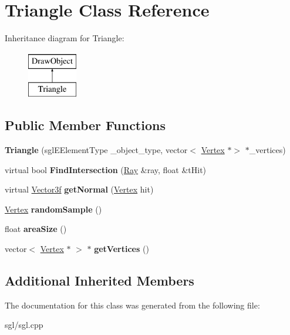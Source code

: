 \hypertarget{class_triangle}{}\section{Triangle Class Reference}
\label{class_triangle}
Inheritance diagram for Triangle\+:\begin{figure}[H]
\begin{center}
\leavevmode
\includegraphics[height=2.000000cm]{class_triangle}
\end{center}
\end{figure}
\subsection*{Public Member Functions}
\begin{DoxyCompactItemize}
\item 
\mbox{\label{class_triangle_aea5e936b8cb88b19c5cf6e9704bc13db}} 
{\bfseries Triangle} (sgl\+E\+Element\+Type \+\_\+object\+\_\+type, vector$<$ \hyperlink{class_vertex}{Vertex} $\ast$$>$ $\ast$\+\_\+vertices)
\item 
\mbox{\label{class_triangle_a5928933b2095b43375a38f48ec265c32}} 
virtual bool {\bfseries Find\+Intersection} (\hyperlink{class_ray}{Ray} \&ray, float \&t\+Hit)
\item 
\mbox{\label{class_triangle_aa2ba0470a4524e65335e1729bb5df109}} 
virtual \hyperlink{class_vector3f}{Vector3f} {\bfseries get\+Normal} (\hyperlink{class_vertex}{Vertex} hit)
\item 
\mbox{\label{class_triangle_a120fc129e68a5b04f9ad8a67a383f9c1}} 
\hyperlink{class_vertex}{Vertex} {\bfseries random\+Sample} ()
\item 
\mbox{\label{class_triangle_adb5bf3b29239d6758ad301627f2bebbc}} 
float {\bfseries area\+Size} ()
\item 
\mbox{\label{class_triangle_a38afc42ec5be95a7320366b170cca749}} 
vector$<$ \hyperlink{class_vertex}{Vertex} $\ast$ $>$ $\ast$ {\bfseries get\+Vertices} ()
\end{DoxyCompactItemize}
\subsection*{Additional Inherited Members}


The documentation for this class was generated from the following file\+:\begin{DoxyCompactItemize}
\item 
sgl/sgl.\+cpp\end{DoxyCompactItemize}
